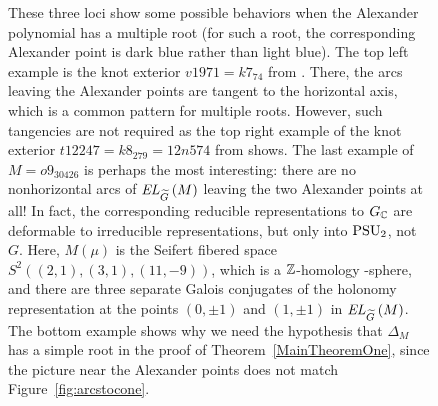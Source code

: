 \documentclass[tikz, sepfignums, defaultenums]{nmd/article}
\newcommand{\G}{G}
\newcommand{\GC}{G_\C}
\newcommand{\TEL}[1]{\mathit{EL}_\Gtil\left(#1\right)}
\begin{document}
\begin{figure}
  \begin{center}

     \hspace{-0.5cm}


  \end{center}
  \caption{These three loci show some possible behaviors when the
    Alexander polynomial has a multiple root (for such a root, the
    corresponding Alexander point is dark blue rather than light
    blue).  The top left example is the knot exterior
    $v1971 = k7_{74}$ from \cite{ChampanerkarKofmanPatterson2004}.
    There, the arcs leaving the Alexander points are tangent to the
    horizontal axis, which is a common pattern for multiple roots.
    However, such tangencies are not required as the top right example
    of the knot exterior $t12247 = k8_{279} = 12n574$ from
    \cite{ChampanerkarKofmanMullen2014} shows.  The last example of
    $M = o9_{30426}$ is perhaps the most interesting: there are no
    nonhorizontal arcs of $\TEL{M}$ leaving the two Alexander points
    at all!  In fact, the corresponding reducible representations to
    $\GC$ are deformable to irreducible representations, but only into
    $\mathrm{PSU}_2$, not $\G$.  Here, $M(\mu)$ is the Seifert fibered space
    $S^2((2,1), (3,1), (11,-9))$, which is a ${\mathbb Z}$-homology \3-sphere, and
    there are three separate Galois conjugates of the holonomy
    representation at the points $(0, \pm 1)$ and $(1, \pm 1)$ in
    $\TEL{M}$.  The bottom example shows why we need the hypothesis
    that $\Delta_M$ has a simple root in the proof of
    Theorem~\ref{MainTheoremOne}, since the picture near the Alexander
    points does not match Figure~\ref{fig:arcstocone}.
    }
  \label{fig:mult}
\end{figure}
\end{document}
